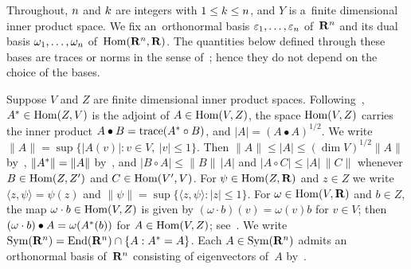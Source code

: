 \documentclass[a4paper,twoside,leqno]{article}
\begin{document}
\begin{miniremark}
    \label{mr:notation}
    Throughout, $n$ and $k$ are integers with $1 \le k \le n$, and $Y$ is
    a~finite dimensional inner product space. We fix an~orthonormal basis $\varepsilon_1, \ldots,
    \varepsilon_{n}$ of~$\mathbf{R}^{n}$ and its dual basis $\omega_1, \ldots, \omega_{n}$
    of~$\operatorname{Hom}(\mathbf{R}^{n},\mathbf{R})$. The quantities below defined through these bases are traces or norms
    in the sense of~\cite[1.7.9, 1.7.10]{Federer1969}; hence they do not depend on the choice of
    the bases.

    Suppose $V$ and $Z$ are finite dimensional inner product spaces. Following~\cite[1.7.4,
    1.7.9]{Federer1969}, $A^{*} \in \operatorname{Hom}(Z,V)$ is the adjoint of $A \in \operatorname{Hom}(V,Z)$, the
    space $\operatorname{Hom}(V,Z)$ carries the inner product $A \bullet B = \operatorname{trace}(A^{*} \circ B)$, and
    $|A| = (A \bullet A)^{1/2}$. We write $\|A\| = \sup \{ |A(v)| : v \in V,\ |v| \le 1 \}$. Then
    $\|A\| \le |A| \le (\dim V)^{1/2} \|A\|$ by~\cite[1.7.9]{Federer1969}, $\|A^{*}\| =
    \|A\|$ by~\cite[1.7.6]{Federer1969}, and $|B \circ A| \le \|B\| \, |A|$ and $|A \circ C| \le |A| \, \|C\|$ whenever $B \in
    \operatorname{Hom}(Z,Z')$ and $C \in \operatorname{Hom}(V',V)$. For $\psi \in \operatorname{Hom}(Z,\mathbf{R})$ and $z \in Z$ we write $\langle z, \psi \rangle =
    \psi(z)$ and $\|\psi\| = \sup \{ \langle z, \psi \rangle : |z| \le 1 \}$. For $\omega \in
    \operatorname{Hom}(V,\mathbf{R})$ and $b \in Z$, the map $\omega \cdot b \in \operatorname{Hom}(V,Z)$ is given by $(\omega \cdot
    b)(v) = \omega(v) b$ for $v \in V$; then $(\omega \cdot b) \bullet A = \omega(A^{*}(b))$
    for $A \in \operatorname{Hom}(V,Z)$; see~\cite[2.3(4)]{Allard1972}. We write $\mathrm{Sym}({\mathbf{R}^{n}}) =
    \mathrm{End}({\mathbf{R}^{n}}) \cap \{ A : A^{*} = A \}$. Each $A \in \mathrm{Sym}({\mathbf{R}^{n}})$ admits an
    orthonormal basis of~$\mathbf{R}^{n}$ consisting of eigenvectors of~$A$
    by~\cite[1.7.3]{Federer1969}.


\end{miniremark}
\end{document}

